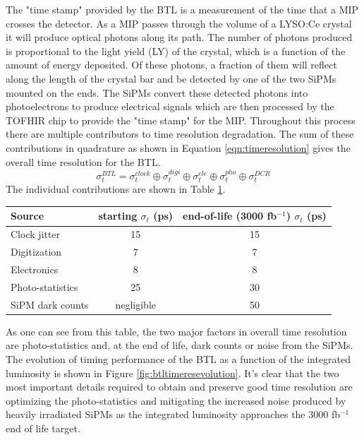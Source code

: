 The "time stamp" provided by the BTL is a measurement of the time that a MIP crosses the detector.  As a MIP passes through the volume of a LYSO:Ce crystal it will produce optical photons along its path.  The number of photons produced is proportional to the light yield (LY) of the crystal, which is a function of the amount of energy deposited.  Of these photons, a fraction of them will reflect along the length of the crystal bar and be detected by one of the two SiPMs mounted on the ends.  The SiPMs convert these detected photons into photoelectrons to produce electrical signals which are then processed by the TOFHIR chip to provide the "time stamp" for the MIP.  Throughout this process there are multiple contributors to time resolution degradation.  The sum of these contributions in quadrature as shown in Equation \ref{eqn:timeresolution} gives the overall time resolution for the BTL.
\begin{equation}
	\sigma_t^{BTL} = \sigma_t^{clock} \oplus \sigma_t^{digi} \oplus \sigma_t^{ele} \oplus \sigma_t^{pho} \oplus \sigma_t^{DCR}
	\label{eqn:timeresolution}
\end{equation}
The individual contributions are shown in Table \ref{table:timeres}.
\begin{table}[h]
	\centering
	\begin{tabular}{|l|c|c|}
		\hline
		Source & starting $\sigma_t$ (ps) & end-of-life (3000 fb$^{-1}$) $\sigma_t$ (ps)\\
		\hline
		Clock jitter & 15 & 15 \\
		\hline
		Digitization & 7 & 7 \\
		\hline
		Electronics & 8 & 8 \\
		\hline
		Photo-statistics & 25 & 30 \\
		\hline
		SiPM dark counts & negligible & 50 \\
		\hline
	\end{tabular}		
\label{table:timeres}
\end{table}
As one can see from this table, the two major factors in overall time resolution are photo-statistics and, at the end of life, dark counts or noise from the SiPMs.  The evolution of timing performance of the BTL as a function of the integrated luminosity is shown in Figure \ref{fig:btltimeresevolution}.  It's clear that the two most important details required to obtain and preserve good time resolution are optimizing the photo-statistics and mitigating the increased noise produced by heavily irradiated SiPMs as the integrated luminosity approaches the 3000 fb$^{-1}$ end of life target.    

